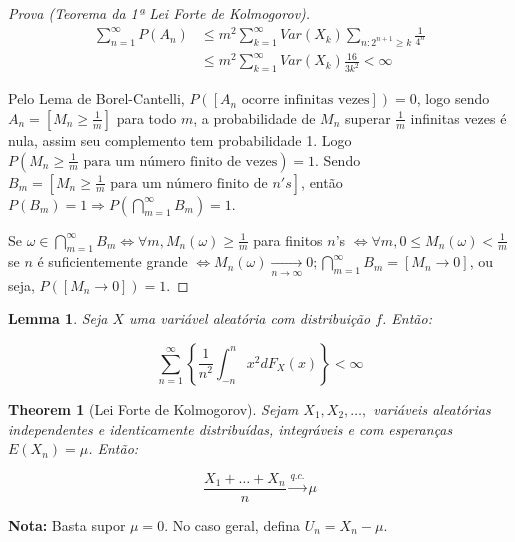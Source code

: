 \documentclass[
]{article}
\newtheorem{theorem}{Theorem}[section]
\newtheorem{lemma}{Lemma}[section]
\theoremstyle{definition}
\theoremstyle{definition}
\theoremstyle{definition}
\theoremstyle{definition}
\theoremstyle{remark}
\begin{document}
\begin{proof}[Prova (Teorema da 1ª Lei Forte de Kolmogorov)]
\begin{align*}
\sum_{n=1}^{\infty}P(A_{n}) &\le m^{2}\sum_{k=1}^{\infty}Var(X_{k})\sum_{n:2^{n+1} \ge k}\frac{1}{4^{n}} \\
&\le m^{2}\sum_{k=1}^{\infty}Var(X_{k})\frac{16}{3k^{2}} < \infty
\end{align*}

Pelo Lema de Borel-Cantelli, \(P([A_{n} \text{ ocorre infinitas vezes}]) = 0\), logo sendo \(A_{n} = \left[M_{n} \ge \frac{1}{m}\right]\) para todo \(m\), a probabilidade de \(M_{n}\) superar \(\frac{1}{m}\) infinitas vezes é nula, assim seu complemento tem probabilidade 1. Logo \(P\left(M_{n} \ge \frac{1}{m} \text{ para um número finito de vezes}\right) = 1\). Sendo \(B_{m} = \left[M_{n} \ge \frac{1}{m} \text{ para um número finito de }n's\right]\), então \(P(B_{m}) = 1 \Rightarrow P\left(\bigcap_{m=1}^{\infty}B_{m}\right) = 1\).

Se \(\omega \in \bigcap_{m=1}^{\infty}B_{m} \Leftrightarrow \forall m, M_{n}(\omega) \ge \frac{1}{m}\) para finitos \(n\)'s \(\Leftrightarrow \forall m, 0 \le M_{n}(\omega) < \frac{1}{m}\) se \(n\) é suficientemente grande \(\Leftrightarrow M_{n}(\omega) \xrightarrow[n \to \infty]{}0; \bigcap_{m=1}^{\infty}B_{m} = [M_{n} \to 0]\), ou seja, \(P([M_{n} \to 0]) = 1\).
\end{proof}

\begin{lemma}
\protect\hypertarget{lem:sumvarfinita}{}\label{lem:sumvarfinita}Seja \(X\) uma variável aleatória com distribuição \(f\). Então:

\begin{equation*}
\sum_{n=1}^{\infty}\left\{\frac{1}{n^{2}}\int_{-n}^{n}x^{2}dF_{X}(x)\right\} < \infty
\end{equation*}
\end{lemma}

\begin{theorem}[Lei Forte de Kolmogorov]
Sejam \(X_{1},X_{2},\ldots,\) variáveis aleatórias independentes e identicamente distribuídas, integráveis e com esperanças \(E(X_{n}) = \mu\). Então:

\begin{equation*}
\frac{X_{1} + \ldots + X_{n}}{n} \xrightarrow[]{q.c.}\mu
\end{equation*}
\end{theorem}

\textbf{Nota:} Basta supor \(\mu = 0\). No caso geral, defina \(U_{n} = X_{n} - \mu\).
\end{document}
